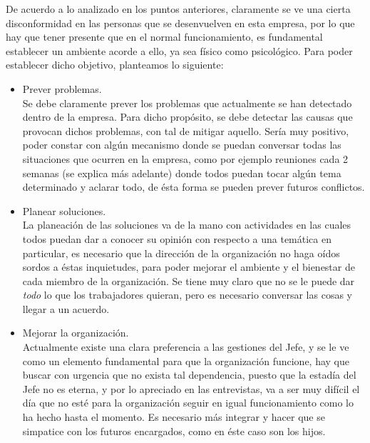 
De acuerdo a lo analizado en los puntos anteriores, claramente se ve una 
cierta disconformidad en las personas que se desenvuelven en esta empresa,
por lo que hay que tener presente que en el normal funcionamiento, es 
fundamental establecer un ambiente acorde a ello, ya sea físico como
psicológico. Para poder establecer dicho objetivo, planteamos lo siguiente:



\begin{itemize}
	\item Prever problemas. \\
	Se debe claramente prever los problemas que actualmente se han
	detectado dentro de la empresa. Para dicho propósito, se debe detectar las causas
	que provocan dichos problemas, con tal de mitigar aquello.
	Sería muy positivo, poder constar con algún mecanismo donde se puedan conversar
	todas las situaciones que ocurren en la empresa, como por ejemplo
	reuniones cada 2 semanas (se explica más adelante) donde todos puedan
	tocar algún tema determinado y aclarar todo, de ésta forma se pueden prever
	futuros conflictos. 

	\item Planear soluciones. \\
	La planeación de las soluciones va de la mano con actividades en las cuales todos puedan dar
	a conocer su opinión con respecto a una temática en particular, es necesario que la dirección
	de la organización no haga oídos sordos a éstas inquietudes, para poder mejorar el ambiente
	y el bienestar de cada miembro de la organización.
	Se tiene muy claro que no se le puede dar \emph{todo} lo que los trabajadores quieran, pero es
	necesario conversar las cosas y llegar a un acuerdo.

    \item Mejorar la organización.\\
	Actualmente existe una clara preferencia a las gestiones del Jefe, y se le ve como un
	elemento fundamental para que la organización funcione, hay que buscar con urgencia que
	no exista tal dependencia, puesto que la estadía del Jefe no es eterna, y por lo apreciado
	en las entrevistas, va a ser muy difícil el día que no esté para la organización seguir
	en igual funcionamiento como lo ha hecho hasta el momento. Es necesario más integrar y hacer
	que se simpatice con los futuros encargados, como en éste caso son los hijos.


\end{itemize}
